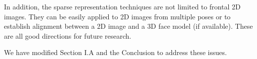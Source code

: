 \documentclass[11pt]{article}
\begin{document}
\begin{enumerate}
In addition, the sparse representation techniques are not limited to frontal 2D images.
They can be easily applied to 2D images from multiple poses or to establish alignment
between a 2D image and a 3D face model (if available). These are all good directions
for future research.

We have modified Section I.A and the Conclusion to address these issues.

\end{enumerate}
\end{document}
